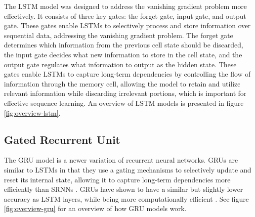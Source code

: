 The LSTM model was designed to address the vanishing gradient problem more effectively. It consists of three key gates: the forget gate, input gate, and output gate. These gates enable LSTMs to selectively process and store information over sequential data, addressing the vanishing gradient problem. The forget gate determines which information from the previous cell state should be discarded, the input gate decides what new information to store in the cell state, and the output gate regulates what information to output as the hidden state. These gates enable LSTMs to capture long-term dependencies by controlling the flow of information through the memory cell, allowing the model to retain and utilize relevant information while discarding irrelevant portions, which is important for effective sequence learning. An overview of LSTM models is presented in figure \ref{fig:overview-lstm}.

\subsection{Gated Recurrent Unit}

The GRU model is a newer variation of recurrent neural networks. GRUs are similar to LSTMs in that they use a gating mechanisms to selectively update and reset its internal state, allowing it to capture long-term dependencies more efficiently than SRNNs \cite{model-gru}. GRUs have shown to have a similar but slightly lower accuracy as LSTM layers, while being more computationally efficient \cite{gru-lstm-performance}. See figure \ref{fig:overview-gru} for an overview of how GRU models work.

